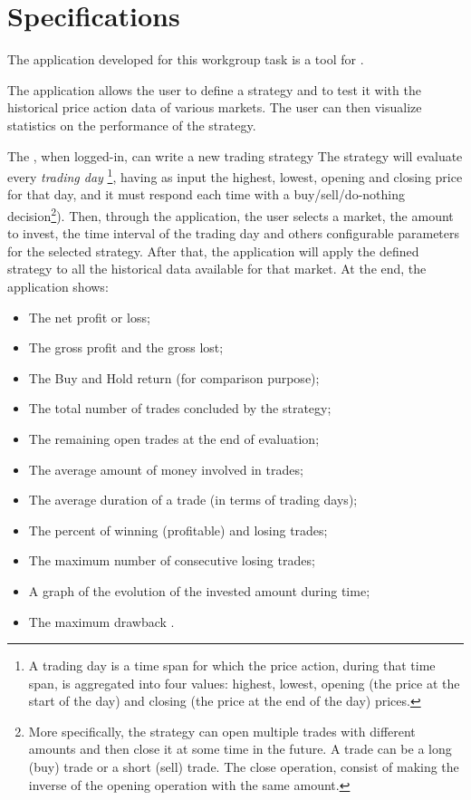 \chapter{Specifications}\label{ch:specs}

The application developed for this workgroup task is a tool for
.

The application allows the user to define a strategy and to test it with the
historical price action data of various markets. The user can then visualize
statistics on the performance of the strategy.

The , when logged-in, can write a new trading strategy %
The strategy will evaluate every \emph{trading day}
\footnote{A trading day is a time span
for which the price action, during that time span, is aggregated into four
values: highest, lowest, opening (the price at the start of the day) and closing
(the price at the end of the day) prices.}, having as input the highest, lowest,
opening and closing price for that day, and it must respond each time with a
buy/sell/do-nothing decision\footnote{More specifically, the strategy can open
multiple trades with different amounts and then close it at some time in the
future. A trade can be a long (buy) trade or a short (sell) trade. The close
operation, consist of making the inverse of the opening operation with the same
amount.}). Then, through the application, the user selects a market, the amount
to invest, the time interval of the trading day and others configurable
parameters for the selected strategy. After that, the application will apply the
defined strategy to all the historical data available for that market. At the
end, the application shows:
\begin{itemize}
	\item The net profit or loss;
	\item The gross profit  and the gross lost;
	\item The Buy and Hold return (for comparison purpose);
	\item The total number of trades concluded by the strategy;
	\item The remaining open trades at the end of evaluation;
	\item The average amount of money involved in trades;
	\item The average duration of a trade (in terms of trading days);
	\item The percent of winning (profitable) and losing trades;
	\item The maximum number of consecutive losing trades;
	\item A graph of the evolution of the invested amount during time;
	\item The maximum drawback .
\end{itemize}

